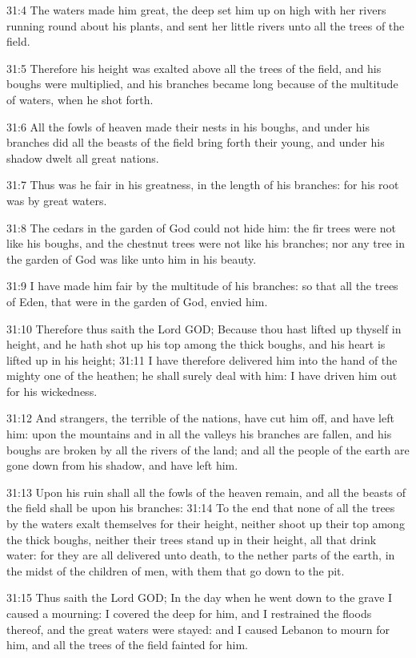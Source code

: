 31:4 The waters made him great, the deep set him up on high with her
rivers running round about his plants, and sent her little rivers unto
all the trees of the field.

31:5 Therefore his height was exalted above all the trees of the
field, and his boughs were multiplied, and his branches became long
because of the multitude of waters, when he shot forth.

31:6 All the fowls of heaven made their nests in his boughs, and under
his branches did all the beasts of the field bring forth their young,
and under his shadow dwelt all great nations.

31:7 Thus was he fair in his greatness, in the length of his branches:
for his root was by great waters.

31:8 The cedars in the garden of God could not hide him: the fir trees
were not like his boughs, and the chestnut trees were not like his
branches; nor any tree in the garden of God was like unto him in his
beauty.

31:9 I have made him fair by the multitude of his branches: so that
all the trees of Eden, that were in the garden of God, envied him.

31:10 Therefore thus saith the Lord GOD; Because thou hast lifted up
thyself in height, and he hath shot up his top among the thick boughs,
and his heart is lifted up in his height; 31:11 I have therefore
delivered him into the hand of the mighty one of the heathen; he shall
surely deal with him: I have driven him out for his wickedness.

31:12 And strangers, the terrible of the nations, have cut him off,
and have left him: upon the mountains and in all the valleys his
branches are fallen, and his boughs are broken by all the rivers of
the land; and all the people of the earth are gone down from his
shadow, and have left him.

31:13 Upon his ruin shall all the fowls of the heaven remain, and all
the beasts of the field shall be upon his branches: 31:14 To the end
that none of all the trees by the waters exalt themselves for their
height, neither shoot up their top among the thick boughs, neither
their trees stand up in their height, all that drink water: for they
are all delivered unto death, to the nether parts of the earth, in the
midst of the children of men, with them that go down to the pit.

31:15 Thus saith the Lord GOD; In the day when he went down to the
grave I caused a mourning: I covered the deep for him, and I
restrained the floods thereof, and the great waters were stayed: and I
caused Lebanon to mourn for him, and all the trees of the field
fainted for him.

